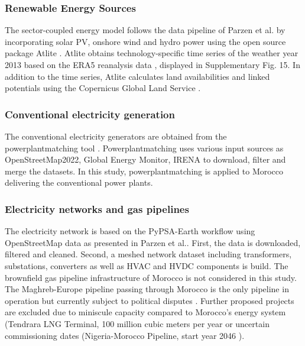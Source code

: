 \subsubsection*{Renewable Energy Sources}
The sector-coupled energy model follows the data pipeline of Parzen et al.\cite{Parzen2023} by incorporating solar PV, onshore wind and hydro power using the open source package Atlite \cite{Hofmann2021}.
Atlite obtains technology-specific time series of the weather year 2013 based on the ERA5 reanalysis data \cite{Hersbach2020}, displayed in Supplementary Fig. 15. %
In addition to the time series, Atlite calculates land availabilities and linked potentials using the Copernicus Global Land Service \cite{Buchhorn2020}.






\subsubsection*{Conventional electricity generation}
The conventional electricity generators are obtained from the powerplantmatching tool \cite{Powerplantmatching2019}. Powerplantmatching uses various input sources as OpenStreetMap2022, Global Energy Monitor, IRENA \cite{IRENA2022, OpenStreetMap2022, GlobalEnergyMonitor} to download, filter and merge the datasets. 
In this study, powerplantmatching is applied to Morocco delivering the conventional power plants.

\subsubsection*{Electricity networks and gas pipelines}
The electricity network is based on the PyPSA-Earth workflow using OpenStreetMap data \cite{OpenStreetMap2022} as presented in Parzen et al.\cite{Parzen2023}. First, the data is downloaded, filtered and cleaned. Second, a meshed network dataset including transformers, substations, converters as well as HVAC and HVDC components is build\cite{Parzen2023}. 
The brownfield gas pipeline infrastructure of Morocco is not considered in this study. The Maghreb-Europe pipeline passing through Morocco is the only pipeline in operation but currently subject to political disputes \cite{Rachidi2022}. Further proposed projects are excluded due to  miniscule capacity compared to Morocco's energy system (Tendrara LNG Terminal, 100 million cubic meters per year or uncertain commissioning dates (Nigeria-Morocco Pipeline, start year 2046 \cite{GEM2023b}).


